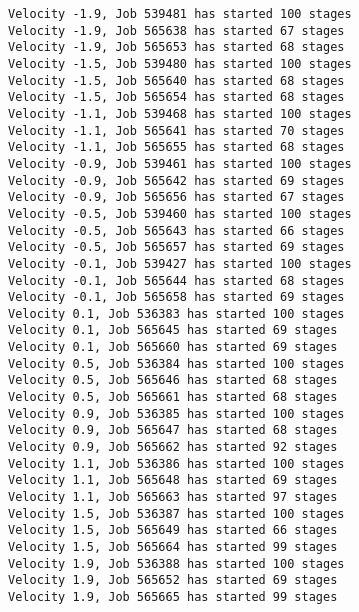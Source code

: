 \documentclass[11pt]{article}
\begin{document}
    \begin{Verbatim}[commandchars=\\\{\}]
Velocity -1.9, Job 539481 has started 100 stages
Velocity -1.9, Job 565638 has started 67 stages
Velocity -1.9, Job 565653 has started 68 stages
Velocity -1.5, Job 539480 has started 100 stages
Velocity -1.5, Job 565640 has started 68 stages
Velocity -1.5, Job 565654 has started 68 stages
Velocity -1.1, Job 539468 has started 100 stages
Velocity -1.1, Job 565641 has started 70 stages
Velocity -1.1, Job 565655 has started 68 stages
Velocity -0.9, Job 539461 has started 100 stages
Velocity -0.9, Job 565642 has started 69 stages
Velocity -0.9, Job 565656 has started 67 stages
Velocity -0.5, Job 539460 has started 100 stages
Velocity -0.5, Job 565643 has started 66 stages
Velocity -0.5, Job 565657 has started 69 stages
Velocity -0.1, Job 539427 has started 100 stages
Velocity -0.1, Job 565644 has started 68 stages
Velocity -0.1, Job 565658 has started 69 stages
Velocity 0.1, Job 536383 has started 100 stages
Velocity 0.1, Job 565645 has started 69 stages
Velocity 0.1, Job 565660 has started 69 stages
Velocity 0.5, Job 536384 has started 100 stages
Velocity 0.5, Job 565646 has started 68 stages
Velocity 0.5, Job 565661 has started 68 stages
Velocity 0.9, Job 536385 has started 100 stages
Velocity 0.9, Job 565647 has started 68 stages
Velocity 0.9, Job 565662 has started 92 stages
Velocity 1.1, Job 536386 has started 100 stages
Velocity 1.1, Job 565648 has started 69 stages
Velocity 1.1, Job 565663 has started 97 stages
Velocity 1.5, Job 536387 has started 100 stages
Velocity 1.5, Job 565649 has started 66 stages
Velocity 1.5, Job 565664 has started 99 stages
Velocity 1.9, Job 536388 has started 100 stages
Velocity 1.9, Job 565652 has started 69 stages
Velocity 1.9, Job 565665 has started 99 stages

    \end{Verbatim}
\end{document}
